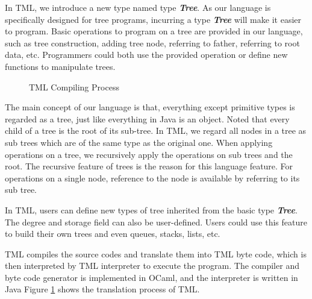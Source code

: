 \documentclass[12pt,psfig,a4]{article}
\begin{document}
In TML, we introduce a new type named type \textbf{\emph{Tree}}. As our language is specifically designed for tree programs, incurring a type \textbf{\emph{Tree}} will make it easier to program. Basic operations to program on a tree are provided in our language, such as tree construction, adding tree node, referring to father, referring to root data, etc. Programmers could both use the provided operation or define new functions to manipulate trees.

\begin{figure}[hb]
{\centering {} \par}
\caption{TML Compiling Process}
\label{TCP}
\end{figure}

The main concept of our language is that, everything except primitive types is regarded as a tree, just like everything in Java is an object. Noted that every child of a tree is the root of its sub-tree. In TML, we regard all nodes in a tree as sub trees which are of the same type as the original one. When applying operations on a tree, we recursively apply the operations on sub trees and the root. The recursive feature of trees is the reason for this language feature. For operations on a single node, reference to the node is available by referring to its sub tree.

In TML, users can define new types of tree inherited from the basic type \textbf{\emph{Tree}}. The degree and storage field can also be user-defined. Users could use this feature to build their own trees and even queues, stacks, lists, etc.

TML compiles the source codes and translate them into TML byte code, which is then interpreted by TML interpreter to execute the program. The compiler and byte code generator is implemented in OCaml, and the interpreter is written in Java Figure \ref{TCP} shows the translation process of TML.
\end{document}
